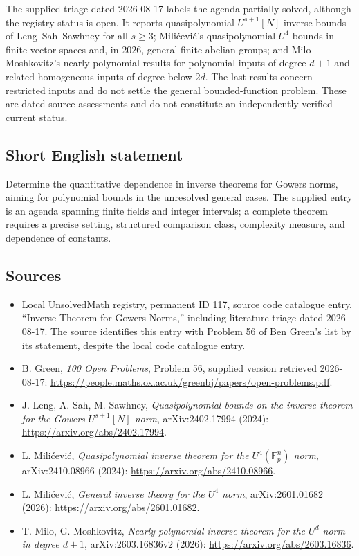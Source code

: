 \documentclass[11pt]{article}
\newcommand{\F}{\mathbb{F}}
\begin{document}
The supplied triage dated 2026-08-17 labels the agenda partially solved, although the registry status is open. It reports quasipolynomial \(U^{s+1}[N]\) inverse bounds of Leng--Sah--Sawhney for all \(s\geq3\); Mili\'cevi\'c's quasipolynomial \(U^4\) bounds in finite vector spaces and, in 2026, general finite abelian groups; and Milo--Moshkovitz's nearly polynomial results for polynomial inputs of degree \(d+1\) and related homogeneous inputs of degree below \(2d\). The last results concern restricted inputs and do not settle the general bounded-function problem. These are dated source assessments and do not constitute an independently verified current status.
\subsection{Short English statement}
Determine the quantitative dependence in inverse theorems for Gowers norms, aiming for polynomial bounds in the unresolved general cases. The supplied entry is an agenda spanning finite fields and integer intervals; a complete theorem requires a precise setting, structured comparison class, complexity measure, and dependence of constants.
\subsection{Sources}
\begin{itemize}
\item Local UnsolvedMath registry, permanent ID 117, source code catalogue entry, ``Inverse Theorem for Gowers Norms,'' including literature triage dated 2026-08-17. The source identifies this entry with Problem 56 of Ben Green's list by its statement, despite the local code catalogue entry.
\item B. Green, \emph{100 Open Problems}, Problem 56, supplied version retrieved 2026-08-17: \url{https://people.maths.ox.ac.uk/greenbj/papers/open-problems.pdf}.
\item J. Leng, A. Sah, M. Sawhney, \emph{Quasipolynomial bounds on the inverse theorem for the Gowers \(U^{s+1}[N]\)-norm}, arXiv:2402.17994 (2024): \url{https://arxiv.org/abs/2402.17994}.
\item L. Mili\'cevi\'c, \emph{Quasipolynomial inverse theorem for the \(U^4(\F_p^n)\) norm}, arXiv:2410.08966 (2024): \url{https://arxiv.org/abs/2410.08966}.
\item L. Mili\'cevi\'c, \emph{General inverse theory for the \(U^4\) norm}, arXiv:2601.01682 (2026): \url{https://arxiv.org/abs/2601.01682}.
\item T. Milo, G. Moshkovitz, \emph{Nearly-polynomial inverse theorem for the \(U^d\) norm in degree \(d+1\)}, arXiv:2603.16836v2 (2026): \url{https://arxiv.org/abs/2603.16836}.
\end{itemize}
\end{document}
